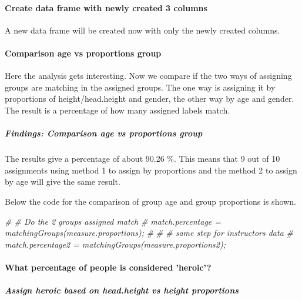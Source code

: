 \documentclass[]{article}
\newenvironment{Shaded}{\begin{snugshade}}{\end{snugshade}}
\newcommand{\CommentTok}[1]{\textcolor[rgb]{0.56,0.35,0.01}{\textit{#1}}}
\begin{document}
\paragraph{Create data frame with newly created 3 columns}
\label{sec:appendix-new-proportions-df}

A new data frame will be created now with only the newly created
columns.

\paragraph{Comparison age vs proportions group}
\label{sec:appendix-comparison-age-vs-proportions-group}

Here the analysis gets interesting. Now we compare if the two ways of
assigning groups are matching in the assigned groups. The one way is
assigning it by proportions of height/head.height and gender, the other
way by age and gender. The result is a percentage of how many assigned
labels match.

\subparagraph{Findings: Comparison age vs proportions group}
\label{sec:appendix-findings-comparison-age-vs-proportions-group}

The results give a percentage of about 90.26 \%. This means that 9 out
of 10 assignments using method 1 to assign by proportions and the method
2 to assign by age will give the same result.

Below the code for the comparison of group age and group proportions is
shown.

\begin{Shaded}
\begin{Highlighting}[]
\CommentTok{\# \# Do the 2 groups assigned match}
\CommentTok{\# match.percentage = matchingGroups(measure.proportions);}
\CommentTok{\# }
\CommentTok{\# \# same step for instructors data}
\CommentTok{\# match.percentage2 = matchingGroups(measure.proportions2);}
\end{Highlighting}
\end{Shaded}

\newpage

\paragraph{What percentage of people is considered 'heroic'?}
\label{sec:appendix-heroic}

\subparagraph{Assign heroic based on head.height vs height proportions}
\label{sec:appendix-heroic-proportions}
\end{document}
